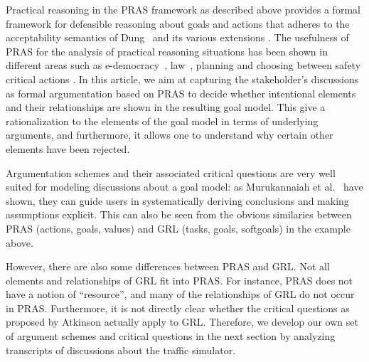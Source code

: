 Practical reasoning in the PRAS framework as described above provides a formal framework for defeasible reasoning about goals and actions that adheres to the acceptability semantics of Dung~\cite{Dung1995} and its various extensions \cite{amgoud2002reasoning,modgil2009}. The usefulness of PRAS for the analysis of practical reasoning situations has been shown in different areas such as e-democracy~\cite{cartwright2009IS}, law~\cite{atkinson2005legal}, planning \cite{medellin2013planning} and choosing between safety critical actions \cite{tolchinsky2012deliberation}. In this article, we aim at capturing the stakeholder's discussions as formal argumentation based on PRAS to decide whether intentional elements and their relationships are shown in the resulting goal model. This give a rationalization to the elements of the goal model in terms of underlying arguments, and furthermore, it allows one to understand why certain other elements have been rejected.

Argumentation schemes and their associated critical questions are very well suited for modeling discussions about a goal model: as Murukannaiah et al.~\cite{murukannaiah2015} have shown, they can guide users in systematically deriving conclusions and making assumptions explicit. This can also be seen from the obvious similaries between PRAS (actions, goals, values) and GRL (tasks, goals, softgoals) in the example above.

However, there are also some differences between PRAS and GRL. Not all elements and relationships of GRL fit into PRAS. For instance, PRAS does not have a notion of ``resource'', and many of the relationships of GRL do not occur in PRAS. Furthermore, it is not directly clear whether the critical questions as proposed by Atkinson actually apply to GRL. Therefore, we develop our own set of argument schemes and critical questions in the next section by analyzing transcripts of discussions about the traffic simulator.